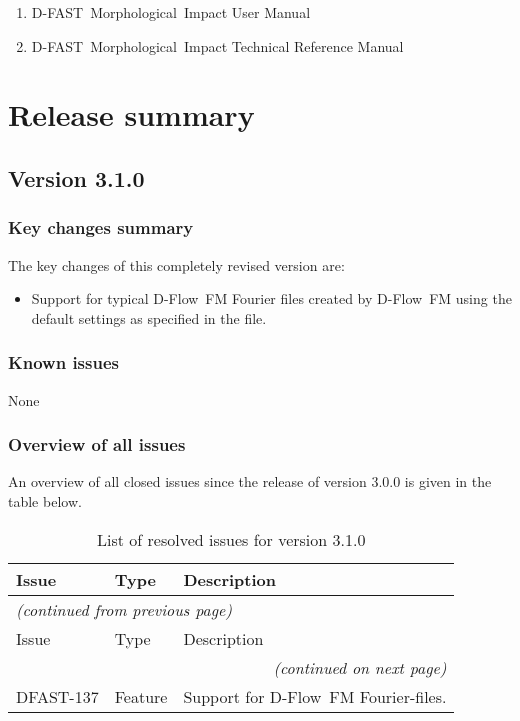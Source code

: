 \documentclass[git]{deltares_manual}
\newcommand{\dfastmi}{\textrm{D-FAST~Morphological~Impact}\xspace}
\newcommand{\dflowfm}{\textrm{D-Flow~FM}\xspace}
\begin{document}
\begin{enumerate}
\item \dfastmi User Manual
\item \dfastmi Technical Reference Manual
\end{enumerate}

\chapter{Release summary}

\section{Version 3.1.0}
\subsection{Key changes summary}
The key changes of this completely revised version are:

\begin{itemize}
\item Support for typical \dflowfm Fourier files created by \dflowfm using the default settings as specified in the  file.
\end{itemize}

\subsection{Known issues}

None

\subsection{Overview of all issues}

An overview of all closed issues since the release of version 3.0.0 is given in the table below.

\begin{longtable}{l|l|p{8cm}}
\caption{List of resolved issues for version 3.1.0} \\
Issue & Type & Description \\ \hline
\endfirsthead
\multicolumn{3}{l}{\textsl{(continued from previous page)}} \\
Issue & Type & Description \\ \hline
\endhead
\hline \multicolumn{3}{r}{\textsl{(continued on next page)}} \\
\endfoot
\endlastfoot 
DFAST-137 & Feature & Support for \dflowfm Fourier-files. \\
\end{longtable}
\end{document}

